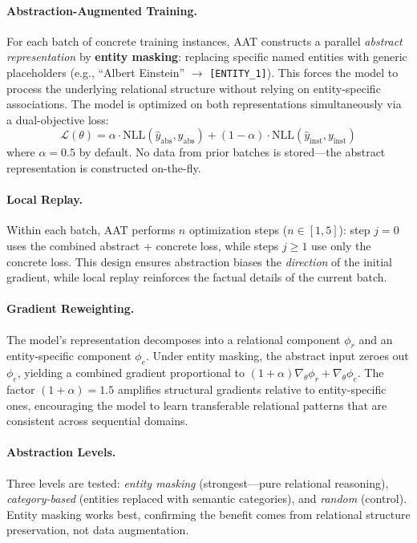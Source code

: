 \documentclass[11pt]{article}
\begin{document}
\paragraph{Abstraction-Augmented Training.}
For each batch of concrete training instances, AAT constructs a parallel \textit{abstract representation} by \textbf{entity masking}: replacing specific named entities with generic placeholders (e.g., ``Albert Einstein'' $\to$ \texttt{[ENTITY\_1]}). This forces the model to process the underlying relational structure without relying on entity-specific associations. The model is optimized on both representations simultaneously via a dual-objective loss:
\begin{equation}
\mathcal{L}(\theta) = \alpha \cdot \mathrm{NLL}(\hat{y}_{\mathrm{abs}}, y_{\mathrm{abs}}) + (1 - \alpha) \cdot \mathrm{NLL}(\hat{y}_{\mathrm{inst}}, y_{\mathrm{inst}})
\end{equation}
where $\alpha = 0.5$ by default. No data from prior batches is stored---the abstract representation is constructed on-the-fly.

\paragraph{Local Replay.}
Within each batch, AAT performs $n$ optimization steps ($n \in [1, 5]$): step $j=0$ uses the combined abstract + concrete loss, while steps $j \geq 1$ use only the concrete loss. This design ensures abstraction biases the \textit{direction} of the initial gradient, while local replay reinforces the factual details of the current batch.

\paragraph{Gradient Reweighting.}
The model's representation decomposes into a relational component $\phi_r$ and an entity-specific component $\phi_e$. Under entity masking, the abstract input zeroes out $\phi_e$, yielding a combined gradient proportional to $(1 + \alpha) \nabla_\theta \phi_r + \nabla_\theta \phi_e$. The factor $(1 + \alpha) = 1.5$ amplifies structural gradients relative to entity-specific ones, encouraging the model to learn transferable relational patterns that are consistent across sequential domains.

\paragraph{Abstraction Levels.}
Three levels are tested: \textit{entity masking} (strongest---pure relational reasoning), \textit{category-based} (entities replaced with semantic categories), and \textit{random} (control). Entity masking works best, confirming the benefit comes from relational structure preservation, not data augmentation.
\end{document}
